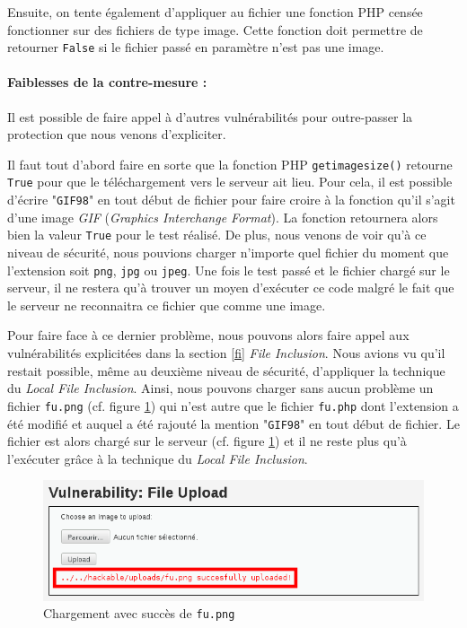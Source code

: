 Ensuite, on tente également d'appliquer au fichier une fonction PHP censée fonctionner sur des fichiers de type image. Cette fonction doit permettre de retourner \texttt{False} si le fichier passé en paramètre n'est pas une image.

\paragraph{Faiblesses de la contre-mesure :}

Il est possible de faire appel à d'autres vulnérabilités pour outre-passer la protection que nous venons d'expliciter.

Il faut tout d'abord faire en sorte que la fonction PHP \texttt{getimagesize()} retourne \texttt{True} pour que le téléchargement vers le serveur ait lieu. Pour cela, il est possible d'écrire "\texttt{GIF98}" en tout début de fichier pour faire croire à la fonction qu'il s'agit d'une image \textit{GIF} (\textit{Graphics Interchange Format}). La fonction retournera alors bien la valeur \texttt{True} pour le test réalisé. De plus, nous venons de voir qu'à ce niveau de sécurité, nous pouvions charger n'importe quel fichier du moment que l'extension soit \texttt{png}, \texttt{jpg} ou \texttt{jpeg}. Une fois le test passé et le fichier chargé sur le serveur, il ne restera qu'à trouver un moyen d'exécuter ce code malgré le fait que le serveur ne reconnaitra ce fichier que comme une image.

Pour faire face à ce dernier problème, nous pouvons alors faire appel aux vulnérabilités explicitées dans la section \ref{fi} \textit{File Inclusion}. Nous avions vu qu'il restait possible, même au deuxième niveau de sécurité, d'appliquer la technique du \textit{Local File Inclusion}. Ainsi, nous pouvons charger sans aucun problème un fichier \texttt{fu.png} (cf. figure \ref{fu_dvwa6}) qui n'est autre que le fichier \texttt{fu.php} dont l'extension a été modifié et auquel a été rajouté la mention "\texttt{GIF98}" en tout début de fichier. Le fichier est alors chargé sur le serveur (cf. figure \ref{fu_dvwa6}) et il ne reste plus qu'à l'exécuter grâce à la technique du \textit{Local File Inclusion}.

\begin{figure}[!h]
\begin{center}
\includegraphics[scale=.5]{images/fu6.png}

\caption{Chargement avec succès de \texttt{fu.png}}
\label{fu_dvwa6}
\end{center}
\end{figure}


